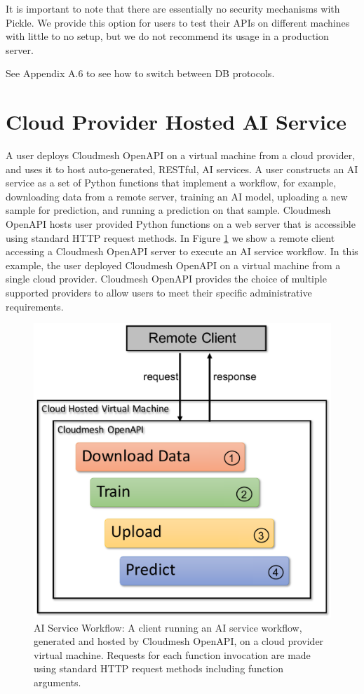 It is important to note that there are essentially no security
mechanisms with Pickle. We provide this option for users to test their
APIs on different machines with little to no setup, but we do not
recommend its usage in a production server.

See Appendix A.6 to see how to switch between DB protocols.

\section{Cloud Provider Hosted AI
Service}\label{cloud-provider-hosted-ai-service}

A user deploys Cloudmesh OpenAPI on a virtual machine from a cloud
provider, and uses it to host auto-generated, RESTful, AI services. A
user constructs an AI service as a set of Python functions that
implement a workflow, for example, downloading data from a remote
server, training an AI model, uploading a new sample for prediction, and
running a prediction on that sample. Cloudmesh OpenAPI hosts user
provided Python functions on a web server that is accessible using
standard HTTP request methods. In Figure \ref{fig:1} we show a remote client
accessing a Cloudmesh OpenAPI server to execute an AI service workflow.
In this example, the user deployed Cloudmesh OpenAPI on a virtual
machine from a single cloud provider. Cloudmesh OpenAPI provides the
choice of multiple supported providers to allow users to meet their
specific administrative requirements.

\begin{figure}[htb]
\centering

\includegraphics[width=0.7\columnwidth]{paper/images/architecture-openapi-1.pdf}

\caption{AI Service Workflow: A client running an AI service workflow, generated
and hosted by Cloudmesh OpenAPI, on a cloud provider virtual machine.
Requests for each function invocation are made using standard HTTP
request methods including function arguments.
}
\label{fig:1}
\end{figure}


